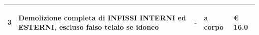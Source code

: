 \documentclass[a4paper]{article}
\begin{document}
\begin{tabular}{ | L{10mm} |  L{86mm} | L{12mm} | L{12mm} | L{16mm} | }
                                 
                                   \vspace{2.5mm}
                                   \begin{spacing}{0}
                                3
                                   \end{spacing} &
                                   \vspace{2.5mm}
                                   \begin{spacing}{0}
                                Demolizione completa di INFISSI INTERNI ed ESTERNI, escluso falso telaio se idoneo
                                   \end{spacing} &
                                   \vspace{2.5mm}
                                   \begin{spacing}{0}
                                -
                                   \end{spacing} &
                                   \vspace{2.5mm}
                                   \begin{spacing}{0}
                                a corpo
                                   \end{spacing} &
                                   \vspace{2.5mm}
                                   \begin{spacing}{0}
                                     \euro\hfill 
                                 16.0
                                   \end{spacing} \\
                                   \hline

                                 \end{tabular} \\
\end{document}
